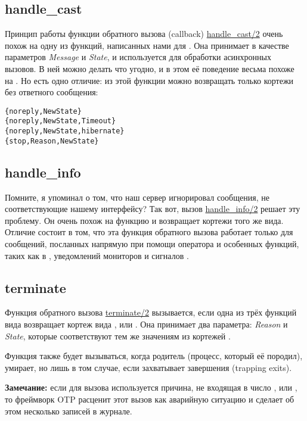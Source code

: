 \subsection{handle\_cast}
\label{handle-cast}
Принцип работы функции обратного вызова (callback) \href{http://erldocs.com/R15B/stdlib/gen\_server.html#handle\_cast/2}{handle\_cast/2} очень похож на одну из функций, написанных нами для .
Она принимает в качестве параметров \emph{Message} и \emph{State}, и используется для обработки асинхронных вызовов.
В ней можно делать что угодно, и в этом её поведение весьма похоже на .
Но есть одно отличие: из этой функции можно возвращать только кортежи без ответного сообщения:
\begin{lstlisting}[style=erlang]
{noreply,NewState}
{noreply,NewState,Timeout}
{noreply,NewState,hibernate}
{stop,Reason,NewState}
\end{lstlisting}
\subsection{handle\_info}
\label{hande-info}
Помните, я упоминал о том, что наш сервер игнорировал сообщения, не соответствующие нашему интерфейсу?
Так вот, вызов \href{http://erldocs.com/R15B/stdlib/gen\_server.html#handle\_info/2}{handle\_info/2} решает эту проблему.
Он очень похож на функцию  и возвращает кортежи того же вида.
Отличие состоит в том, что эта функция обратного вызова работает только для сообщений, посланных напрямую при помощи оператора \ops{!} и особенных функций, таких как  в , уведомлений мониторов и сигналов .
\subsection{terminate}
\label{terminate}
Функция обратного вызова \href{http://erldocs.com/R15B/stdlib/gen\_server.html#terminate/2}{terminate/2} вызывается, если одна из трёх функций вида  возвращает кортеж вида , или .
Она принимает два параметра: \emph{Reason} и \emph{State}, которые соответствуют тем же значениям из кортежей .

Функция  также будет вызываться, когда родитель (процесс, который её породил), умирает, но лишь в том случае, если  захватывает завершения (trapping exits).

\colorbox{lgray}
{
\begin{minipage}{1.0\linewidth}
    \textbf{Замечание:} если для вызова  используется причина, не входящая в число ,  или , то фреймворк OTP расценит этот вызов как аварийную ситуацию и сделает об этом несколько записей в журнале.
\end{minipage}
}

